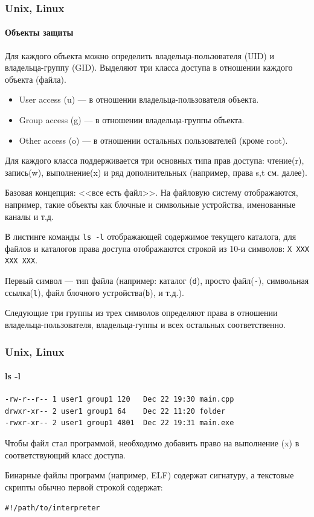 \begin{frame}
    \frametitle{Unix, Linux}
    \framesubtitle{Объекты защиты}
    
    Для каждого объекта можно определить владельца-пользователя (UID) и владельца-группу (GID). Выделяют три класса доступа в отношении каждого объекта (файла).
    \begin{itemize}
        \item User access (\alert{u}) --- в отношении владельца-пользователя объекта.
        \item Group access (\alert{g}) --- в отношении владельца-группы объекта.
        \item Other access (\alert{o}) --- в отношении остальных пользователей (кроме root).
    \end{itemize}
    Для каждого класса поддерживается три основных типа прав доступа: чтение(\alert{r}), запись(\alert{w}), выполнение(\alert{x}) и ряд дополнительных (например, права \alert{s},\alert{t} см. далее).
    
    Базовая концепция: <<все есть файл>>. На файловую систему отображаются, например, такие объекты как блочные и символьные устройства, именованные каналы и т.д. 
\end{frame}


В листинге команды \verb"ls -l" отображающей содержимое текущего каталога, для файлов и каталогов права доступа отображаются строкой из 10-и символов: \verb"X XXX XXX XXX".
    
Первый символ --- тип файла (например: каталог (\verb"d"), просто файл(\verb"-"), символьная ссылка(\verb"l"),  файл блочного устройства(\verb"b"), и т.д.).
    
Следующие три группы из трех символов определяют права в отношении владельца-пользователя, владельца-гуппы и всех остальных соответственно.

\begin{frame}[fragile]
    \frametitle{Unix, Linux}
    \framesubtitle{ls -l}

\begin{verbatim}
-rw-r--r-- 1 user1 group1 120   Dec 22 19:30 main.cpp
drwxr-xr-- 2 user1 group1 64    Dec 22 11:20 folder
-rwxr-xr-- 2 user1 group1 4801  Dec 22 19:31 main.exe
\end{verbatim}

Чтобы файл стал программой, необходимо добавить право на выполнение (\alert{x}) в соответствующий класс доступа.

Бинарные файлы программ (например, ELF) содержат сигнатуру, а текстовые скрипты обычно первой строкой содержат:

\verb"#!/path/to/interpreter"

\end{frame}


